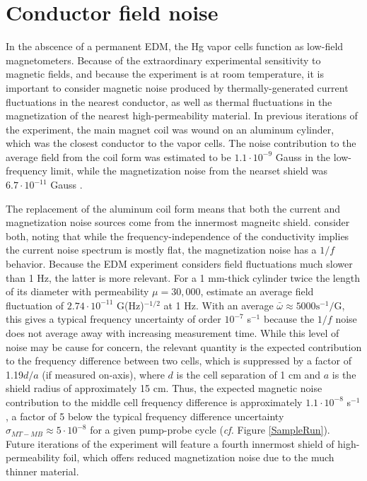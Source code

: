 \documentclass [10pt, twoside] {uwthesis}[2012/04/02]
\begin{document}
\section{Conductor field noise} %
In the abscence of a permanent EDM, the Hg vapor cells function as low-field magnetometers. Because of the extraordinary experimental sensitivity to magnetic fields, and because the experiment is at room temperature, it is important to consider magnetic noise produced by thermally-generated current fluctuations in the nearest conductor, as well as thermal fluctuations in the magnetization of the nearest high-permeability material. In previous iterations of the experiment, the main magnet coil was wound on an aluminum cylinder, which was the closest conductor to the vapor cells. The noise contribution to the average field from the coil form was estimated to be $1.1 \cdot10^{-9}$ Gauss in the low-frequency limit, while the magnetization noise from the nearset shield was $6.7\cdot 10^{-11}$ Gauss \cite{Swallows}.  

The replacement of the aluminum coil form means that both the current and magnetization noise sources come from the innermost magneitc shield. \cite{2008_Romalis_Lee_Mag_Field_Noise} consider both, noting that while the frequency-independence of the conductivity implies the current noise spectrum is mostly flat, the magnetization noise has a $1/f$ behavior. Because the EDM experiment considers field fluctuations much slower than 1 Hz, the latter is more relevant. For a 1 mm-thick cylinder twice the length of its diameter with permeability $\mu=30,000$, \cite{2008_Romalis_Lee_Mag_Field_Noise} estimate an average field fluctuation of $2.74\cdot10^{-11}$ G(Hz)$^{-1/2}$ at 1 Hz. With an average $\bar{\omega} \approx 5000 \text{s}^{-1}/\text{G}$, this gives a typical frequency uncertainty of order $10^{-7}$ s$^{-1}$ because the $1/f$ noise does not average away with increasing measurement time. While this level of noise may be cause for concern, the relevant quantity is the expected contribution to the frequency difference between two cells, which is suppressed by a factor of 1.19$d/a$ (if measured on-axis), where $d$ is the cell separation of 1 cm and $a$ is the shield radius of approximately 15 cm. Thus, the expected magnetic noise contribution to the middle cell frequency difference is approximately $1.1\cdot10^{-8}$ s$^{-1}$, a factor of 5 below the typical frequency difference uncertainty $\sigma_{MT-MB} \approx 5 \cdot 10^{-8}$ for a given pump-probe cycle (\textit{cf.} Figure \ref{SampleRun}). Future iterations of the experiment will feature a fourth innermost shield of high-permeability foil, which offers reduced magnetization noise due to the much thinner material. 
\end{document}
